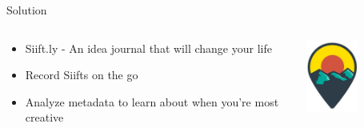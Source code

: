\begin{frame}{Solution}
\begin{columns}
\begin{column}{0.5\textwidth}
\begin{itemize}
\item Siift.ly - An idea journal that will change your life
\item Record Siifts on the go
\item Analyze metadata to learn about when you're most creative
\end{itemize}
\end{column}
\begin{column}{0.5\textwidth}  %
    \begin{center}
     \includegraphics[width=0.5\textwidth]{img/logo}
     \end{center}
\end{column}
\end{columns}
\end{frame}
